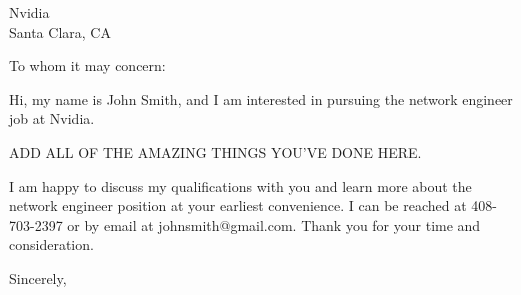 \documentclass[11pt]{letter} %
\begin{document}

\begin{letter}{ Nvidia \\
Santa Clara, CA } 



\signature{John Smith} %


\opening{To whom it may concern:} 
 
Hi, my name is John Smith, and I am interested in pursuing the network engineer job at Nvidia.

ADD ALL OF THE AMAZING THINGS YOU'VE DONE HERE.


I am happy to discuss my qualifications with you and learn more about the network engineer 
position at your earliest convenience. I can be reached at 408-703-2397 or by email 
at johnsmith@gmail.com. Thank you for your time and consideration.

\closing{Sincerely,}




\end{letter}
\end{document}
